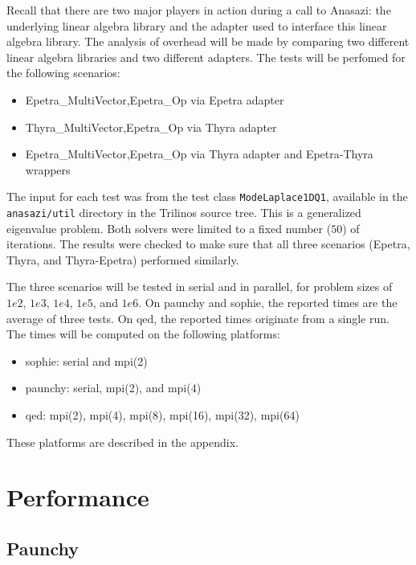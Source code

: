 \documentclass[10pt]{article}
\begin{document}
Recall that there are two major players in action during a call to Anasazi: the underlying
linear algebra library and the adapter used to interface this linear algebra library. The
analysis of overhead will be made by comparing two different linear algebra libraries and
two different adapters. The tests will be perfomed for the following scenarios:
\begin{itemize}
\item Epetra\_MultiVector,Epetra\_Op via Epetra adapter
\item Thyra\_MultiVector,Epetra\_Op  via Thyra adapter 
\item Epetra\_MultiVector,Epetra\_Op via Thyra adapter and Epetra-Thyra wrappers
\end{itemize}

The input for each test was from the test class \verb!ModeLaplace1DQ1!, available in the
\verb!anasazi/util! directory in the Trilinos source tree. This is a generalized
eigenvalue problem. Both solvers were limited to a fixed number ($50$) of iterations. The
results were checked to make sure that all three scenarios (Epetra, Thyra, and
Thyra-Epetra) performed similarly.

The three scenarios will be tested in serial and in parallel, for problem sizes of $1e2$,
$1e3$, $1e4$, $1e5$, and $1e6$. On paunchy and sophie, the reported times are the average
of three tests. On qed, the reported times originate from a single run. The times will be
computed on the following platforms:
\begin{itemize}
\item sophie: serial and mpi(2)
\item paunchy: serial, mpi(2), and mpi(4)
\item qed: mpi(2), mpi(4), mpi(8), mpi(16), mpi(32), mpi(64)
\end{itemize}

These platforms are described in the appendix.

\section{Performance}

\subsection{Paunchy}
\end{document}
